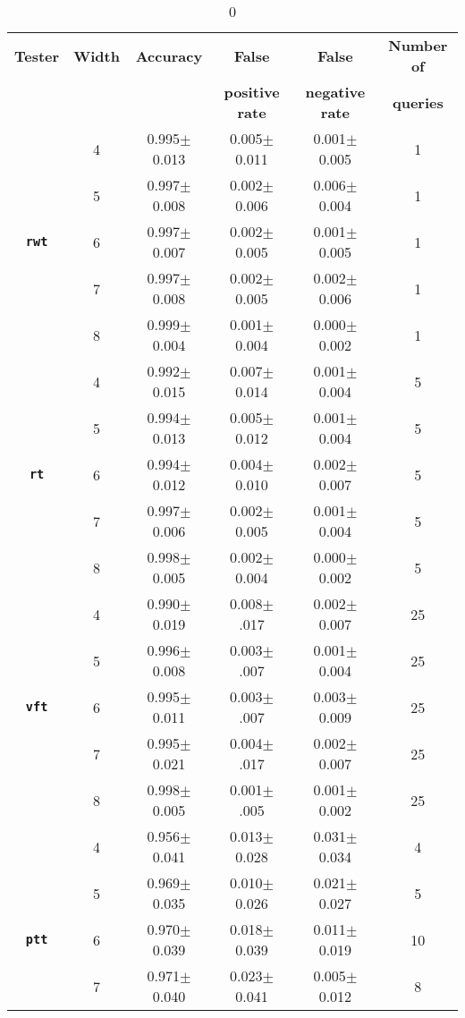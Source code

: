 \begin{table}[!ht]
  \caption{0}
  \label{tab:diff_gwWidth_appendix}
  \centering
  \begin{tabular}{cccccc}
    \toprule
    \textbf{Tester} & \textbf{Width}& \textbf{Accuracy} & \textbf{False} & \textbf{False} & \textbf{Number of} \\
    & & & \textbf{positive rate} & \textbf{negative rate} & \textbf{queries} \\
    \midrule
      & 4 & 0.995$\pm$0.013 & 0.005$\pm$0.011 & 0.001$\pm$0.005	& 1  \\
     & 5 & 0.997$\pm$0.008&	0.002$\pm$0.006&	0.006$\pm$0.004&	1\\
     \textbf{\texttt{rwt}} & 6 & 0.997$\pm$0.007&	0.002$\pm$0.005&	0.001$\pm$0.005&	1\\
     & 7 & 0.997$\pm$0.008&	0.002$\pm$0.005&	0.002$\pm$0.006&	1\\
     & 8 & 0.999$\pm$0.004&	0.001$\pm$0.004&	0.000$\pm$0.002&	1\\
     \midrule
      & 4 & 0.992$\pm$0.015&	0.007$\pm$0.014&	0.001$\pm$0.004&	5\\
     & 5 & 0.994$\pm$0.013&	0.005$\pm$0.012&	0.001$\pm$0.004&	5\\
     \textbf{\texttt{rt}}& 6 & 0.994$\pm$0.012&	0.004$\pm$0.010&	0.002$\pm$0.007&	5\\
     & 7 & 0.997$\pm$0.006&	0.002$\pm$0.005&	0.001$\pm$0.004&	5\\
     & 8 & 0.998$\pm$0.005&	0.002$\pm$0.004&	0.000$\pm$0.002&	5\\ 
     \midrule
      & 4 & 0.990$\pm$0.019&	0.008$\pm$.017&	0.002$\pm$0.007&	25\\
     & 5 & 0.996$\pm$0.008&	0.003$\pm$.007&	0.001$\pm$0.004&	25\\
     \textbf{\texttt{vft}}& 6 & 0.995$\pm$0.011&	0.003$\pm$.007&	0.003$\pm$0.009&	25\\
     & 7 & 0.995$\pm$0.021&	0.004$\pm$.017&	0.002$\pm$0.007&	25\\
     & 8 & 0.998$\pm$0.005&	0.001$\pm$.005&	0.001$\pm$0.002&	25\\
     \midrule
      & 4 & 0.956$\pm$0.041&	0.013$\pm$0.028&	0.031$\pm$0.034&	4\\
     & 5 & 0.969$\pm$0.035&	0.010$\pm$0.026&	0.021$\pm$0.027&	5\\
     \textbf{\texttt{ptt}}& 6 & 0.970$\pm$0.039&	0.018$\pm$0.039&	0.011$\pm$0.019&	10\\
     & 7 & 0.971$\pm$0.040&	0.023$\pm$0.041&	0.005$\pm$0.012&	8\\

\end{tabular}
\end{table}
